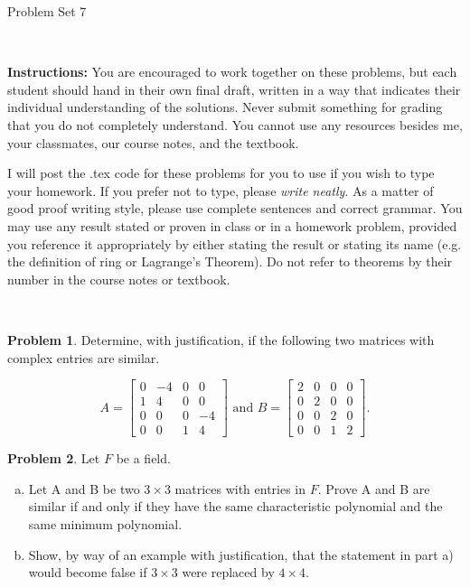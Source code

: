 \documentclass[11pt]{article}
\title{}
\date{\vspace{-0.5in}}
\theoremstyle{definition}
\newtheorem{problem}{Problem}
\begin{document}
\thispagestyle{fancy}
\pagestyle{fancy}

\vspace{3em}

\begin{center}
	{\LARGE Problem Set 7}
\end{center}

\

\noindent
{\bf Instructions:}
You are encouraged to work together on these problems, but each student should hand in their own final draft, written in a way that indicates their individual understanding of the solutions. Never submit something for grading that you do not completely understand. You cannot use any resources besides me, your classmates, our course notes, and the textbook.


I will post the .tex code for these problems for you to use if you wish to type your homework. If you prefer not to type, please  {\em write neatly}. As a matter of good proof writing style, please use complete sentences and correct grammar. You may use any result  stated or proven in class or in a homework problem, provided you reference it appropriately by either stating the result or stating its name (e.g. the definition of ring or Lagrange's Theorem). Do not refer to theorems by their number in the course notes or textbook.


\


\begin{problem}
	Determine, with justification, if the following two matrices with complex entries are similar.
	
	$$A = \begin{bmatrix}
		0 & -4 & 0 & 0 \\
		1 & 4 & 0 & 0 \\
		0 & 0 & 0 & -4 \\
		0 & 0 & 1 & 4
	\end{bmatrix} \textrm{ and } B = \begin{bmatrix}
		2 & 0 & 0 & 0 \\ 0 & 2 & 0 & 0 \\ 0 & 0 & 2 & 0 \\ 0 & 0 & 1 & 2
	\end{bmatrix}.$$ 
\end{problem}





\begin{problem}
Let $F$ be a field.
\begin{enumerate}[a)]
	\item Let A and B be two $3 \times 3$ matrices with entries in $F$. Prove A and B are similar if and only if they have the same characteristic polynomial and the same minimum polynomial.
\item Show, by way of an example with justification, that the statement in part a) would become false if $3 \times 3$ were replaced by $4 \times 4$.
\end{enumerate}
\end{problem}
\end{document}
